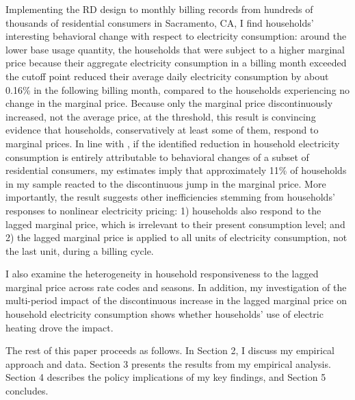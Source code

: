 Implementing the RD design to monthly billing records from hundreds of thousands of residential consumers in Sacramento, CA, I find households' interesting behavioral change with respect to electricity consumption: around the lower base usage quantity, the households that were subject to a higher marginal price because their aggregate electricity consumption in a billing month exceeded the cutoff point reduced their average daily electricity consumption by about 0.16\% in the following billing month, compared to the households experiencing no change in the marginal price. Because only the marginal price discontinuously increased, not the average price, at the threshold, this result is convincing evidence that households, conservatively at least some of them, respond to marginal prices. In line with \cite{Misunderstanding-Nonlinear-Prices_2020_(Shaffer)}, if the identified reduction in household electricity consumption is entirely attributable to behavioral changes of a subset of residential consumers, my estimates imply that approximately 11\% of households in my sample reacted to the discontinuous jump in the marginal price. More importantly, the result suggests other inefficiencies stemming from households' responses to nonlinear electricity pricing: 1) households also respond to the lagged marginal price, which is irrelevant to their present consumption level; and 2) the lagged marginal price is applied to all units of electricity consumption, not the last unit, during a billing cycle. 

I also examine the heterogeneity in household responsiveness to the lagged marginal price across rate codes and seasons. In addition, my investigation of the multi-period impact of the discontinuous increase in the lagged marginal price on household electricity consumption shows whether households' use of electric heating drove the impact. 

The rest of this paper proceeds as follows. In Section 2, I discuss my empirical approach and data. Section 3 presents the results from my empirical analysis. Section 4 describes the policy implications of my key findings, and Section 5 concludes. 
